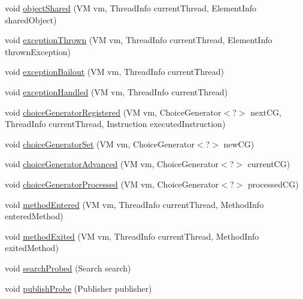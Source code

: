 \begin{DoxyCompactItemize}
\item 
void \hyperlink{classgov_1_1nasa_1_1jpf_1_1inspector_1_1server_1_1jpf_1_1_inspector_listener_aaef72985a081ea14aa9b3618f638eabc}{object\+Shared} (VM vm, Thread\+Info current\+Thread, Element\+Info shared\+Object)
\item 
void \hyperlink{classgov_1_1nasa_1_1jpf_1_1inspector_1_1server_1_1jpf_1_1_inspector_listener_aed2fb6f27c31d8a60ca4775516a8ff85}{exception\+Thrown} (VM vm, Thread\+Info current\+Thread, Element\+Info thrown\+Exception)
\item 
void \hyperlink{classgov_1_1nasa_1_1jpf_1_1inspector_1_1server_1_1jpf_1_1_inspector_listener_a93524f1fc45e235d32e610a65f0168cf}{exception\+Bailout} (VM vm, Thread\+Info current\+Thread)
\item 
void \hyperlink{classgov_1_1nasa_1_1jpf_1_1inspector_1_1server_1_1jpf_1_1_inspector_listener_aff42169bd8529734f9ed58430c060b66}{exception\+Handled} (VM vm, Thread\+Info current\+Thread)
\item 
void \hyperlink{classgov_1_1nasa_1_1jpf_1_1inspector_1_1server_1_1jpf_1_1_inspector_listener_a8c1935475d1344632c567ca0aa274b2e}{choice\+Generator\+Registered} (VM vm, Choice\+Generator$<$?$>$ next\+CG, Thread\+Info current\+Thread, Instruction executed\+Instruction)
\item 
void \hyperlink{classgov_1_1nasa_1_1jpf_1_1inspector_1_1server_1_1jpf_1_1_inspector_listener_a8e9f670192b926b91357c8d18f44380a}{choice\+Generator\+Set} (VM vm, Choice\+Generator$<$?$>$ new\+CG)
\item 
void \hyperlink{classgov_1_1nasa_1_1jpf_1_1inspector_1_1server_1_1jpf_1_1_inspector_listener_a43c6f1f0a7a4c18d5af24df040c96d9e}{choice\+Generator\+Advanced} (VM vm, Choice\+Generator$<$?$>$ current\+CG)
\item 
void \hyperlink{classgov_1_1nasa_1_1jpf_1_1inspector_1_1server_1_1jpf_1_1_inspector_listener_a1ccbb40f5a7f6d72c83dfb7caadd80e9}{choice\+Generator\+Processed} (VM vm, Choice\+Generator$<$?$>$ processed\+CG)
\item 
void \hyperlink{classgov_1_1nasa_1_1jpf_1_1inspector_1_1server_1_1jpf_1_1_inspector_listener_a1ac66bbd491bc401fab171f40c69b8e8}{method\+Entered} (VM vm, Thread\+Info current\+Thread, Method\+Info entered\+Method)
\item 
void \hyperlink{classgov_1_1nasa_1_1jpf_1_1inspector_1_1server_1_1jpf_1_1_inspector_listener_ae737668705dddc043c95537c3fd60d3f}{method\+Exited} (VM vm, Thread\+Info current\+Thread, Method\+Info exited\+Method)
\item 
void \hyperlink{classgov_1_1nasa_1_1jpf_1_1inspector_1_1server_1_1jpf_1_1_inspector_listener_a19fbb5b2d64677a2d23bde506f3be8cf}{search\+Probed} (Search search)
\item 
void \hyperlink{classgov_1_1nasa_1_1jpf_1_1inspector_1_1server_1_1jpf_1_1_inspector_listener_ab76d90497998f2d79f29f5ba7b1786fb}{publish\+Probe} (Publisher publisher)
\end{DoxyCompactItemize}

